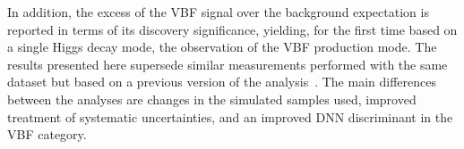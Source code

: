 In addition, the excess of the VBF signal over the background expectation is reported in terms of its discovery significance, yielding, for the first time based on a single Higgs decay mode, the observation of the VBF production mode.
The results presented here supersede similar measurements performed with the same dataset but based on a previous version of the analysis~\cite{ATLAS-CONF-2021-014}.
The main differences between the analyses are changes in the simulated samples used, improved treatment of systematic uncertainties, and an improved DNN discriminant in the VBF category. 

